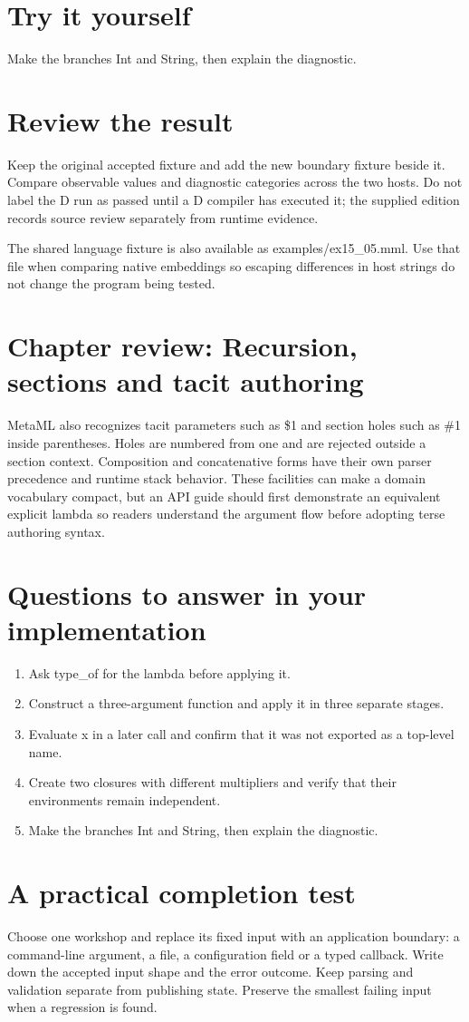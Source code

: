 \section*{Try it yourself}
Make the branches Int and String, then explain the diagnostic.

\section*{Review the result}
Keep the original accepted fixture and add the new boundary fixture beside it. Compare observable values and diagnostic categories across the two hosts. Do not label the D run as passed until a D compiler has executed it; the supplied edition records source review separately from runtime evidence.

The shared language fixture is also available as examples/ex15\_05.mml. Use that file when comparing native embeddings so escaping differences in host strings do not change the program being tested.

\clearpage
\section*{Chapter review: Recursion, sections and tacit authoring}
MetaML also recognizes tacit parameters such as \$1 and section holes such as \#1 inside parentheses. Holes are numbered from one and are rejected outside a section context. Composition and concatenative forms have their own parser precedence and runtime stack behavior. These facilities can make a domain vocabulary compact, but an API guide should first demonstrate an equivalent explicit lambda so readers understand the argument flow before adopting terse authoring syntax.

\section*{Questions to answer in your implementation}
\begin{enumerate}
\item Ask type\_of for the lambda before applying it.
\item Construct a three-argument function and apply it in three separate stages.
\item Evaluate x in a later call and confirm that it was not exported as a top-level name.
\item Create two closures with different multipliers and verify that their environments remain independent.
\item Make the branches Int and String, then explain the diagnostic.
\end{enumerate}
\section*{A practical completion test}
Choose one workshop and replace its fixed input with an application boundary: a command-line argument, a file, a configuration field or a typed callback. Write down the accepted input shape and the error outcome. Keep parsing and validation separate from publishing state. Preserve the smallest failing input when a regression is found.

